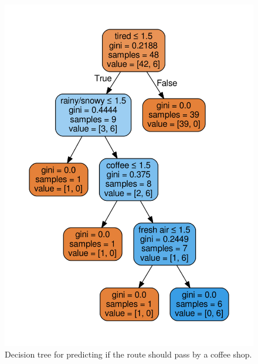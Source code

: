 \documentclass{sigchi}
\begin{document}
\begin{figure}[!h]
\centering
\includegraphics[width=1.0\columnwidth]{pics/decisionTree_4.png}
\caption{Decision tree for predicting if the route should pass by a coffee shop.}
\label{fig:dt4}
\end{figure}
\end{document}
